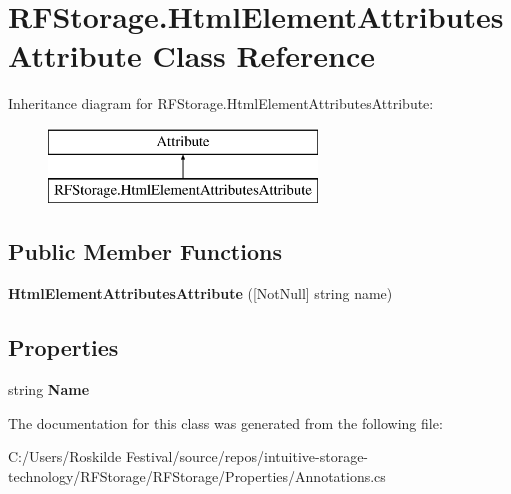 \hypertarget{class_r_f_storage_1_1_html_element_attributes_attribute}{}\section{R\+F\+Storage.\+Html\+Element\+Attributes\+Attribute Class Reference}
\label{class_r_f_storage_1_1_html_element_attributes_attribute}
Inheritance diagram for R\+F\+Storage.\+Html\+Element\+Attributes\+Attribute\+:\begin{figure}[H]
\begin{center}
\leavevmode
\includegraphics[height=2.000000cm]{class_r_f_storage_1_1_html_element_attributes_attribute}
\end{center}
\end{figure}
\subsection*{Public Member Functions}
\begin{DoxyCompactItemize}
\item 
\mbox{\label{class_r_f_storage_1_1_html_element_attributes_attribute_a2f8df01a6544f5dd84b99a2863ee5eb5}} 
{\bfseries Html\+Element\+Attributes\+Attribute} (\mbox{[}Not\+Null\mbox{]} string name)
\end{DoxyCompactItemize}
\subsection*{Properties}
\begin{DoxyCompactItemize}
\item 
\mbox{\label{class_r_f_storage_1_1_html_element_attributes_attribute_aeff0bb51e5ae3bc3dad0f2fedb108cf9}} 
string {\bfseries Name}
\end{DoxyCompactItemize}


The documentation for this class was generated from the following file\+:\begin{DoxyCompactItemize}
\item 
C\+:/\+Users/\+Roskilde Festival/source/repos/intuitive-\/storage-\/technology/\+R\+F\+Storage/\+R\+F\+Storage/\+Properties/Annotations.\+cs\end{DoxyCompactItemize}

